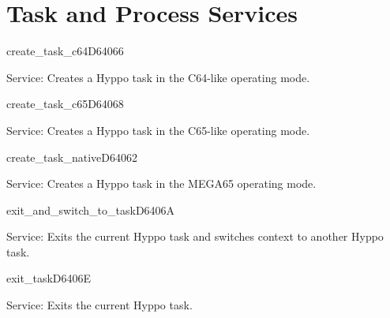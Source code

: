 \section{Task and Process Services}


\begin{hyppotrap}{create\_task\_c64}{D640}{66}
\item [Service:]
  Creates a Hyppo task in the C64-like operating mode.
\notimplemented
\end{hyppotrap}


\begin{hyppotrap}{create\_task\_c65}{D640}{68}
\item [Service:]
  Creates a Hyppo task in the C65-like operating mode.
\notimplemented
\end{hyppotrap}


\begin{hyppotrap}{create\_task\_native}{D640}{62}
\item [Service:]
  Creates a Hyppo task in the MEGA65 operating mode.
\notimplemented
\end{hyppotrap}


\begin{hyppotrap}{exit\_and\_switch\_to\_task}{D640}{6A}
\item [Service:]
  Exits the current Hyppo task and switches context to another Hyppo task.
\notimplemented
\end{hyppotrap}


\begin{hyppotrap}{exit\_task}{D640}{6E}
\item [Service:]
  Exits the current Hyppo task. %
\notimplemented
\end{hyppotrap}


